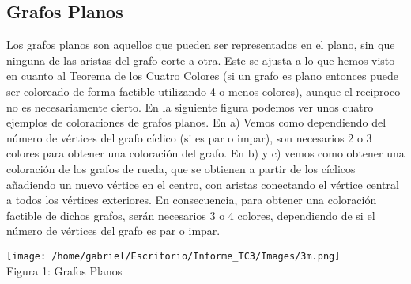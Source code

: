 \documentclass[12pt]{report}
\begin{document}
\subsection{Grafos Planos}
Los grafos planos son aquellos que pueden ser representados en el plano, sin que ninguna de las aristas del grafo corte a otra. Este se ajusta a lo que hemos visto en cuanto al Teorema de los Cuatro Colores (si un grafo es plano entonces puede ser coloreado de forma factible utilizando 4 o menos colores), aunque el reciproco no es necesariamente cierto. En la siguiente figura podemos ver unos cuatro ejemplos de coloraciones de grafos planos. En a) Vemos como dependiendo del número de vértices del grafo cíclico (si es par o impar), son necesarios 2 o 3 colores para obtener una coloración del grafo. En b) y c) vemos como obtener una coloración de los grafos de rueda, que se obtienen a partir de los cíclicos añadiendo un nuevo vértice en el centro, con aristas conectando el vértice central a todos los vértices exteriores. En consecuencia, para obtener una coloración factible de dichos grafos, serán necesarios 3 o 4 colores, dependiendo de si el número de vértices del grafo es par o impar.
\begin{center}
\texttt{[image: /home/gabriel/Escritorio/Informe\_TC3/Images/3m.png]}\\
Figura 1: Grafos Planos
\end{center}
\end{document}
